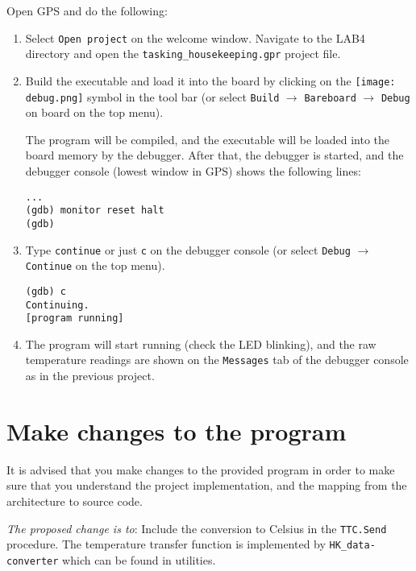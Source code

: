 Open GPS and do the following:
\begin{enumerate}
\item Select {\tt Open project} on the welcome window. Navigate to the LAB4 directory and open the {\tt tasking\_housekeeping.gpr} project file.

\item Build the executable and load it into the board by clicking on the \hbox{\texttt{[image: debug.png]}} symbol in the tool bar (or select {\tt Build} $\rightarrow$ {\tt Bareboard} $\rightarrow$ {\tt Debug} on board on the top menu).

The program will be compiled, and the executable will be loaded into the board memory by the debugger. After that, the debugger is started, and the debugger console (lowest window in GPS) shows the following lines:
\begin{verbatim}
...
(gdb) monitor reset halt
(gdb)
\end{verbatim}

\item Type {\tt continue} or just {\tt c} on the debugger console (or select {\tt Debug} $\rightarrow$ {\tt Continue} on the top menu).
\begin{verbatim}
(gdb) c
Continuing.
[program running]
\end{verbatim}

\item The program will start running (check the LED blinking), and the raw temperature readings are shown on the {\tt Messages} tab of the debugger console as in the previous project.
\end{enumerate}

\section{Make changes to the program}

It is advised that you make changes
to the provided program in order to make sure
that you understand the project implementation,
and the mapping from the architecture to source code.

\textcolor{mRedBrown}{\textit{The proposed change is to}}: Include the conversion to Celsius in the \texttt{TTC.Send} procedure.
The temperature transfer function is implemented by \texttt{HK\_data-converter}
which can be found in utilities.
